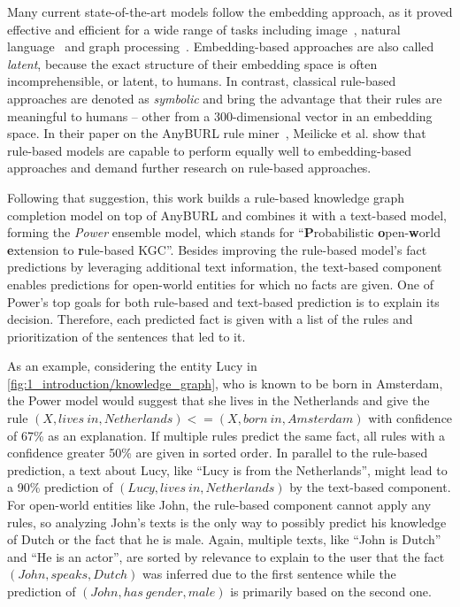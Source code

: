Many current state-of-the-art models follow the embedding approach, as it proved effective and efficient for a wide range of tasks including image~\cite{Khan2020ASO}, natural language~\cite{Young2018RecentTI} and graph processing~\cite{Wu2021ACS}. Embedding-based approaches are also called \emph{latent}, because the exact structure of their embedding space is often incomprehensible, or latent, to humans. In contrast, classical rule-based approaches are denoted as \emph{symbolic} and bring the advantage that their rules are meaningful to humans -- other from a 300-dimensional vector in an embedding space. In their paper on the AnyBURL rule miner~\cite{Meilicke2019AnytimeBR}, Meilicke et al. show that rule-based models are capable to perform equally well to embedding-based approaches and demand further research on rule-based approaches.

Following that suggestion, this work builds a rule-based knowledge graph completion model on top of AnyBURL and combines it with a text-based model, forming the \emph{Power} ensemble model, which stands for ``\textbf{P}robabilistic \textbf{o}pen-\textbf{w}orld \textbf{e}xtension to \textbf{r}ule-based KGC''. Besides improving the rule-based model's fact predictions by leveraging additional text information, the text-based component enables predictions for open-world entities for which no facts are given. One of Power's top goals for both rule-based and text-based prediction is to explain its decision. Therefore, each predicted fact is given with a list of the rules and prioritization of the sentences that led to it.

As an example, considering the entity Lucy in \autoref{fig:1_introduction/knowledge_graph}, who is known to be born in Amsterdam, the Power model would suggest that she lives in the Netherlands and give the rule $(X, lives~in, Netherlands) <= (X, born~in, Amsterdam)$ with confidence of 67\% as an explanation. If multiple rules predict the same fact, all rules with a confidence greater 50\% are given in sorted order. In parallel to the rule-based prediction, a text about Lucy, like ``Lucy is from the Netherlands'', might lead to a 90\% prediction of $(Lucy, lives~in, Netherlands)$ by the text-based component. For open-world entities like John, the rule-based component cannot apply any rules, so analyzing John's texts is the only way to possibly predict his knowledge of Dutch or the fact that he is male. Again, multiple texts, like ``John is Dutch'' and ``He is an actor'', are sorted by relevance to explain to the user that the fact $(John, speaks, Dutch)$ was inferred due to the first sentence while the prediction of $(John, has~gender, male)$ is primarily based on the second one.

